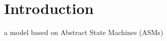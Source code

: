 \chapter{Introduction}
\label{ch:Introduction}










\cite{BIOMICSD41,BIOMICSD42,BIOMICSD52} 

 a model based on Abstract State Machines (ASMs) \cite{BoergerStaerk2003} 









